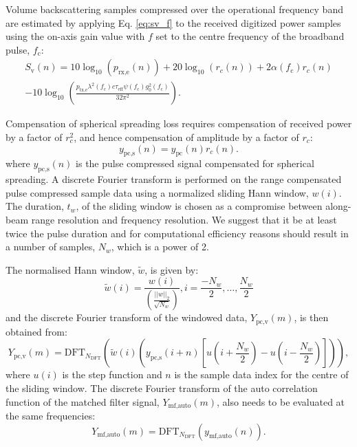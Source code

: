 \documentclass[preprint,12pt,TurnOnLineNumbers]{JASAnew}
\newcommand{\samplesymt}{n}
\newcommand{\samplesymf}{m}
\newcommand{\genidxsym}{i}
\newcommand{\fc}{f_{\textrm{c}}}
\newcommand{\ptxe}{p_{\textrm{tx,e}}}
\newcommand{\prxe}{p_{\textrm{rx,e}}}
\newcommand{\teff}{\tau_{\textrm{eff}}}
\newcommand{\ypc}{y_{\textrm{pc}}}
\newcommand{\ypcspread}{y_{\textrm{pc,s}}}
\newcommand{\ymfauto}{y_{\textrm{mf,auto}}}
\newcommand{\ypcvolumef}{Y_{\textrm{pc,v}}}
\newcommand{\ymfautof}{Y_{\textrm{mf,auto}}}
\newcommand{\hannw}{w}
\newcommand{\hannwnorm}{\tilde{\hannw}}
\newcommand{\nw}{N_{\hannw}}
\newcommand{\tslide}{t_w}
\newcommand{\sv}{S_{\textrm{v}}}
\newcommand{\range}{r}
\newcommand{\gainzero}{g_0}
\newcommand{\eqang}{\psi}
\newcommand{\wlen}{\lambda}
\newcommand{\cw}{c}
\newcommand{\absorp}{\alpha}
\newcommand{\dft}{\textrm{DFT}}
\newcommand{\ndft}{{N_{\textrm{DFT}}}}
\begin{document}
Volume backscattering samples compressed over the operational frequency band are estimated by applying Eq. \ref{eq:sv_f} to the received digitized power samples using the on-axis gain value with $f$ set to the centre frequency of the broadband pulse, $\fc$:
\begin{equation}
\label{eq:Sv}
\begin{split}
\sv(\samplesymt)  =  10\log_{10}(\prxe(\samplesymt)) + 20\log_{10}(\range_c(\samplesymt)) + 2\absorp(\fc)\range_c(\samplesymt) \\
- 10\log_{10}\left( \frac{\ptxe \wlen^2(\fc) \cw \teff \eqang(\fc) \gainzero^2(\fc)}{32\pi^2} \right).
\end{split}
\end{equation}

Compensation of spherical spreading loss requires compensation of received power by a factor of $r_c^2$, and hence compensation of amplitude by a factor of $\range_c$:
%
\begin{equation}
\label{eq:spreadcomp}
\ypcspread(\samplesymt) = \ypc(\samplesymt)\range_c(\samplesymt).
\end{equation}
%
where $\ypcspread(\samplesymt)$ is the pulse compressed signal compensated for spherical spreading. A discrete Fourier transform is performed on the range compensated pulse compressed sample data using a normalized sliding Hann window, $\hannw(\genidxsym)$. The duration, $\tslide$, of the sliding window is chosen as a compromise between along-beam range resolution and frequency resolution. We suggest that it be at least twice the pulse duration and for computational efficiency reasons should result in a number of samples, $\nw$, which is a power of 2.

The normalised Hann window, $\hannwnorm$, is given by: 
%
\begin{equation}
\label{eq:hannw}
\hannwnorm(\genidxsym) = \frac{\hannw(\genidxsym)}{\left( \frac{||\hannw||_2}{\sqrt{\nw}} \right)}, i = \frac{-\nw}{2}, \ldots, \frac{\nw}{2}
\end{equation}
%
and the discrete Fourier transform of the windowed data, $\ypcvolumef(\samplesymf)$, is then obtained from:
%
\begin{equation}
\label{eq:FFT_volume}
\ypcvolumef(\samplesymf) = \dft_\ndft 
\left( \hannwnorm(\genidxsym) \left(\ypcspread (\genidxsym+\samplesymt) \left[ u(\genidxsym + \frac{\nw}{2}) - u(\genidxsym - \frac{\nw}{2}) \right] \right) \right),
\end{equation}
%
where $u(\genidxsym)$ is the step function and $\samplesymt$ is the sample data index for the centre of the sliding window. The discrete Fourier transform of the auto correlation function of the matched filter signal, $\ymfautof(\samplesymf)$, also needs to be evaluated at the same frequencies:
%
\begin{equation}
\label{eq:FFT_TX_Auto}
\ymfautof(\samplesymf)  =  \dft_\ndft (\ymfauto(\samplesymt)).
\end{equation}
\end{document}
